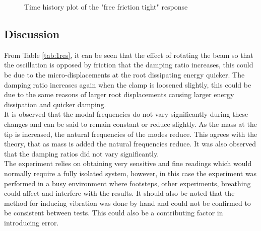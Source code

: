 \documentclass[11pt]{article}
\begin{document}
\begin{figure}[H]
    \centering
    \qquad
    \caption{Time history plot of the "free friction tight" response}
    \label{fig:TS}
\end{figure}
\subsection{Discussion}

From Table \ref{tab:1res}, it can be seen that the effect of rotating the beam so that the oscillation is opposed by friction that the damping ratio increases, this could be due to the micro-displacements at the root dissipating energy quicker. The damping ratio increases again when the clamp is loosened slightly, this could be due to the same reasons of larger root displacements causing larger energy dissipation and quicker damping.\\

It is observed that the modal frequencies do not vary significantly during these changes and can be said to remain constant or reduce slightly.
As the mass at the tip is increased, the natural frequencies of the modes reduce. This agrees with the theory, that as mass is added the natural frequencies reduce. It was also observed that the damping ratios did not vary significantly.\\
The experiment relies on obtaining very sensitive and fine readings which would normally require a fully isolated system, however, in this case the experiment was performed in a busy environment where footsteps, other experiments, breathing could affect and interfere with the results. It should also be noted that the method for inducing vibration was done by hand and could not be confirmed to be consistent between tests. This could also be a contributing factor in introducing error.
\end{document}
